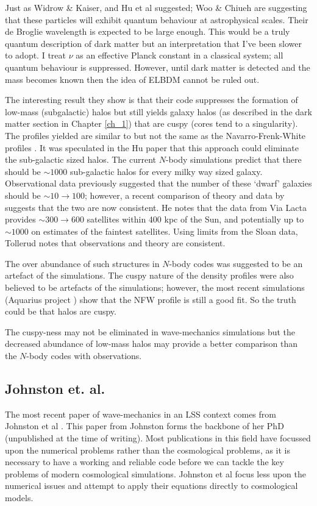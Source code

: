 Just as Widrow \& Kaiser, and Hu et al suggested; Woo \& Chiueh are suggesting that these particles will exhibit quantum behaviour at astrophysical scales. Their de Broglie wavelength is expected to be large enough. This would be a truly quantum description of dark matter but an interpretation that I've been slower to adopt. I treat $\nu$ as an effective Planck constant in a classical system; all quantum behaviour is suppressed. However, until dark matter is detected and the mass becomes known then the idea of ELBDM cannot be ruled out.

The interesting result they show is that their code suppresses the formation of low-mass (subgalactic) halos but still yields galaxy halos (as described in the dark matter section in Chapter \ref{ch_1}) that are cuspy (cores tend to a singularity). The profiles yielded are similar to but not the same as the Navarro-Frenk-White profiles \citep{bib_nfw}. It was speculated in the Hu paper that this approach could eliminate the sub-galactic sized halos. The current $N$-body simulations predict that there should be $\sim 1000$ sub-galactic halos for every milky way sized galaxy. Observational data previously suggested that the number of these `dwarf' galaxies should be $\sim 10 \rightarrow 100$; however, a recent comparison of theory and data by \citet{bib_toll} suggests that the two are now consistent. He notes that the data from Via Lacta provides $\sim 300 \rightarrow 600$ satellites within 400 kpc of the Sun, and potentially up to $\sim 1000$ on estimates of the faintest satellites. Using limits from the Sloan data, Tollerud notes that observations and theory are consistent.

The over abundance of such structures in $N$-body codes was suggested to be an artefact of the simulations. The cuspy nature of the density profiles were also believed to be artefacts of the simulations; however, the most recent simulations (Aquarius project \citep{bib_aqu, bib_nfw2}) show that the NFW profile is still a good fit. So the truth could be that halos are cuspy.

The cuspy-ness may not be eliminated in wave-mechanics simulations but the decreased abundance of low-mass halos may provide a better comparison than the $N$-body codes with observations. \citep{bib_wooc}

\subsection{Johnston et. al.}
\label{johnston}
The most recent paper of wave-mechanics in an LSS context comes from Johnston et al \citep{bib_rj}. This paper from Johnston forms the backbone of her PhD (unpublished at the time of writing). Most publications in this field have focussed upon the numerical problems rather than the cosmological problems, as it is necessary to have a working and reliable code before we can tackle the key problems of modern cosmological simulations. Johnston et al focus less upon the numerical issues and attempt to apply their equations directly to cosmological models.

